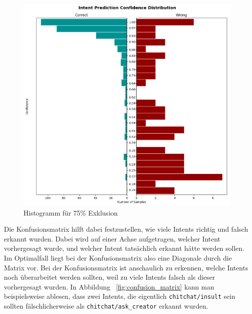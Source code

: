 \begin{figure}[hbt!]
    \centering
    \includegraphics[scale=0.5]{pics/intent_histogram_75}
    \caption{Histogramm für 75\% Exklusion}
    \label{fig:histogram_75}
\end{figure}

Die Konfusionsmatrix hilft dabei festzustellen, wie viele Intents richtig und falsch erkannt wurden.
Dabei wird auf einer Achse aufgetragen, welcher Intent vorhergesagt wurde, und welcher Intent tatsächlich erkannt hätte werden sollen.
Im Optimalfall liegt bei der Konfusionsmatrix also eine Diagonale durch die Matrix vor.
Bei der Konfusionsmatrix ist anschaulich zu erkennen, welche Intents noch überarbeitet werden sollten, weil zu viele Intents falsch als dieser vorhergesagt wurden.
In Abbildung ~\ref{fig:confusion_matrix} kann man beispielsweise ablesen, dass zwei Intents, die eigentlich \texttt{chitchat/insult} sein sollten fälschlicherweise als \texttt{chitchat/ask\_creator} erkannt wurden.

